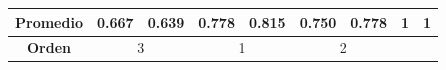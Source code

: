 \begin{table}[H]
\begin{tabular}{|c|c|c|c|c|c|c|c|c|c|c|}
		\hline
		\multicolumn{3}{|c|}{\textbf{Promedio}} & \multicolumn{1}{r|}{0.667} & \multicolumn{1}{r|}{\cellcolor[rgb]{ 1,  1,  0}0.639} & \multicolumn{1}{r|}{0.778} & \multicolumn{1}{r|}{\cellcolor[rgb]{ 1,  1,  0}0.815} & \multicolumn{1}{r|}{0.750} & \multicolumn{1}{r|}{\cellcolor[rgb]{ 1,  1,  0}0.778} & \multicolumn{1}{r|}{1} & \multicolumn{1}{r|}{\cellcolor[rgb]{ 1,  1,  0}1} \bigstrut\\
		\hline
		\multicolumn{3}{|c|}{\textbf{Orden}} & \multicolumn{2}{c|}{3} & \multicolumn{2}{c|}{1} & \multicolumn{2}{c|}{2} & \multicolumn{2}{c|}{} \bigstrut\\
		\hline
	\end{tabular}%
	\label{tab:eval_tecnica}%
\end{table}%

